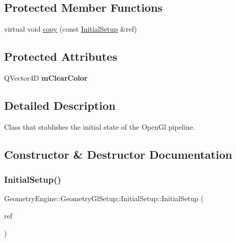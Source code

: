 \subsection*{Protected Member Functions}
\begin{DoxyCompactItemize}
\item 
virtual void \mbox{\hyperlink{class_geometry_engine_1_1_geometry_gl_setup_1_1_initial_setup_a2140bf33e9792369fc60853c58fdc789}{copy}} (const \mbox{\hyperlink{class_geometry_engine_1_1_geometry_gl_setup_1_1_initial_setup}{Initial\+Setup}} \&ref)
\end{DoxyCompactItemize}
\subsection*{Protected Attributes}
\begin{DoxyCompactItemize}
\item 
\mbox{\label{class_geometry_engine_1_1_geometry_gl_setup_1_1_initial_setup_a57a43dd347299730694682cc4d747109}} 
Q\+Vector4D {\bfseries m\+Clear\+Color}
\end{DoxyCompactItemize}


\subsection{Detailed Description}
Class that stablishes the initial state of the Open\+Gl pipeline. 

\subsection{Constructor \& Destructor Documentation}
\mbox{\label{class_geometry_engine_1_1_geometry_gl_setup_1_1_initial_setup_ad6ddb23c7317917d38d9f2510394ee11}} 
\subsubsection{\texorpdfstring{InitialSetup()}{InitialSetup()}}
{\footnotesize\ttfamily Geometry\+Engine\+::\+Geometry\+Gl\+Setup\+::\+Initial\+Setup\+::\+Initial\+Setup (\begin{DoxyParamCaption}\item[{const \mbox{\hyperlink{class_geometry_engine_1_1_geometry_gl_setup_1_1_initial_setup}{Initial\+Setup}} \&}]{ref }\end{DoxyParamCaption})\hspace{0.3cm}{\ttfamily [inline]}}

